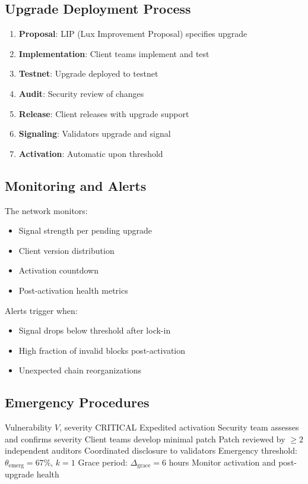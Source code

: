\documentclass[11pt,a4paper]{article}
\theoremstyle{definition}
\theoremstyle{remark}
\begin{document}
\subsection{Upgrade Deployment Process}

\begin{enumerate}
    \item \textbf{Proposal}: LIP (Lux Improvement Proposal) specifies upgrade
    \item \textbf{Implementation}: Client teams implement and test
    \item \textbf{Testnet}: Upgrade deployed to testnet
    \item \textbf{Audit}: Security review of changes
    \item \textbf{Release}: Client releases with upgrade support
    \item \textbf{Signaling}: Validators upgrade and signal
    \item \textbf{Activation}: Automatic upon threshold
\end{enumerate}

\subsection{Monitoring and Alerts}

The network monitors:
\begin{itemize}
    \item Signal strength per pending upgrade
    \item Client version distribution
    \item Activation countdown
    \item Post-activation health metrics
\end{itemize}

Alerts trigger when:
\begin{itemize}
    \item Signal drops below threshold after lock-in
    \item High fraction of invalid blocks post-activation
    \item Unexpected chain reorganizations
\end{itemize}

\subsection{Emergency Procedures}

\begin{algorithm}
\caption{Emergency Upgrade Activation}
\begin{algorithmic}[1]
\Require Vulnerability $V$, severity CRITICAL
\Ensure Expedited activation
\State Security team assesses and confirms severity
\State Client teams develop minimal patch
\State Patch reviewed by $\geq 2$ independent auditors
\State Coordinated disclosure to validators
\State Emergency threshold: $\theta_{\text{emerg}} = 67\%$, $k = 1$
\State Grace period: $\Delta_{\text{grace}} = 6$ hours
\State Monitor activation and post-upgrade health
\end{algorithmic}
\end{algorithm}
\end{document}
